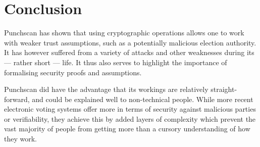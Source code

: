 \chapter{Conclusion}

Punchscan has shown that using cryptographic operations allows one to work with
weaker trust assumptions, such as a potentially malicious election authority.
It has however suffered from a variety of attacks and other weaknesses during
its --- rather short --- life. It thus also serves to highlight the importance
of formalising security proofs and assumptions.

Punchscan did have the advantage that its workings are relatively
straight-forward, and could be explained well to non-technical people. While
more recent electronic voting systems offer more in terms of security against
malicious parties or verifiability, they achieve this by added layers of
complexity which prevent the vast majority of people from getting more than a
cursory understanding of how they work.
